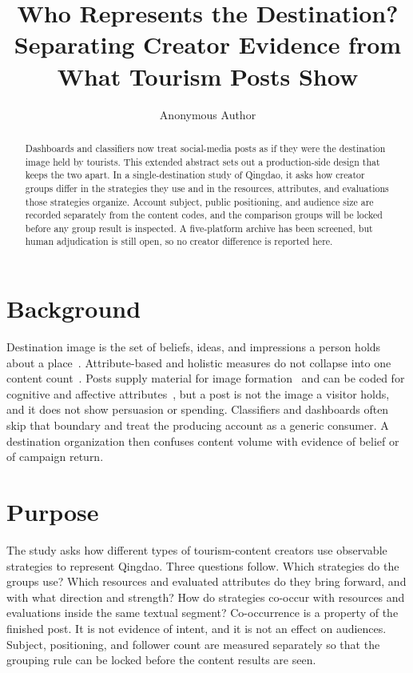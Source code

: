 \documentclass[runningheads]{llncs}
\begin{document}
\title{Who Represents the Destination? Separating Creator Evidence from What Tourism Posts Show}

\author{Anonymous Author}

\maketitle

\begin{abstract}
Dashboards and classifiers now treat social-media posts as if they were the destination image held by tourists. This extended abstract sets out a production-side design that keeps the two apart. In a single-destination study of Qingdao, it asks how creator groups differ in the strategies they use and in the resources, attributes, and evaluations those strategies organize. Account subject, public positioning, and audience size are recorded separately from the content codes, and the comparison groups will be locked before any group result is inspected. A five-platform archive has been screened, but human adjudication is still open, so no creator difference is reported here.

\end{abstract}

\section{Background}
Destination image is the set of beliefs, ideas, and impressions a person holds about a place~\cite{crompton1979}. Attribute-based and holistic measures do not collapse into one content count~\cite{echtner1993,tasci2007}. Posts supply material for image formation~\cite{gartner1994} and can be coded for cognitive and affective attributes~\cite{garay2019}, but a post is not the image a visitor holds, and it does not show persuasion or spending. Classifiers and dashboards often skip that boundary and treat the producing account as a generic consumer. A destination organization then confuses content volume with evidence of belief or of campaign return.

\section{Purpose}
The study asks how different types of tourism-content creators use observable strategies to represent Qingdao. Three questions follow. Which strategies do the groups use? Which resources and evaluated attributes do they bring forward, and with what direction and strength? How do strategies co-occur with resources and evaluations inside the same textual segment? Co-occurrence is a property of the finished post. It is not evidence of intent, and it is not an effect on audiences. Subject, positioning, and follower count are measured separately so that the grouping rule can be locked before the content results are seen.
\end{document}
